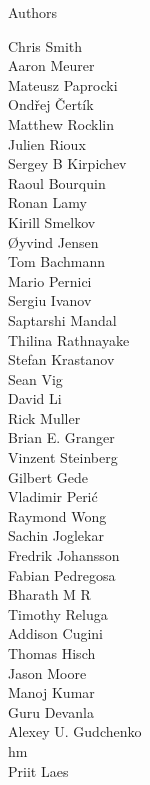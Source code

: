 \documentclass[xcolor=svgnames]{beamer}
\begin{document}
  \begin{frame}{Authors}
    \begin{multicols}{5}
      \tiny
          Chris Smith\\
          Aaron Meurer\\
          Mateusz Paprocki\\
          Ondřej Čertík\\
          Matthew Rocklin\\
          Julien Rioux\\
          Sergey B Kirpichev\\
          Raoul Bourquin\\
          Ronan Lamy\\
          Kirill Smelkov\\
          Øyvind Jensen\\
          Tom Bachmann\\
          Mario Pernici\\
          Sergiu Ivanov\\
          Saptarshi Mandal\\
          Thilina Rathnayake\\
          Stefan Krastanov\\
          Sean Vig\\
          David Li\\
          Rick Muller\\
          Brian E. Granger\\
          Vinzent Steinberg\\
          Gilbert Gede\\
          Vladimir Perić\\
          Raymond Wong\\
          Sachin Joglekar\\
          Fredrik Johansson\\
          Fabian Pedregosa\\
          Bharath M R\\
          Timothy Reluga\\
          Addison Cugini\\
          Thomas Hisch\\
          Jason Moore\\
          Manoj Kumar\\
          Guru Devanla\\
          Alexey U. Gudchenko\\
          hm\\
          Priit Laes\\

\end{multicols}
\end{frame}
\end{document}
